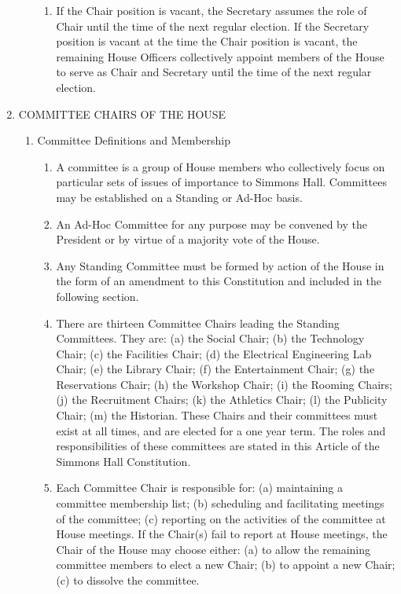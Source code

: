 \documentclass[letterpaper]{article}
\begin{document}
\begin{enumerate}
\begin{enumerate}
\begin{enumerate}
\item If the Chair position is vacant, the Secretary assumes the role of Chair until the time of the next regular election. If the Secretary position is vacant at the time the Chair position is vacant, the remaining House Officers collectively appoint members of the House to serve as Chair and Secretary until the time of the next regular
election.

\end{enumerate}

\end{enumerate}

\item COMMITTEE CHAIRS OF THE HOUSE 

\begin{enumerate}

\item Committee Definitions and Membership 

\begin{enumerate}

\item A committee is a group of House members who collectively focus on particular sets of issues of importance to Simmons Hall. Committees may be established on a Standing or Ad-Hoc basis.

\item An Ad-Hoc Committee for any purpose may be convened by the President or by virtue of a majority vote of the House.

\item Any Standing Committee must be formed by action of the House in the form of an amendment to this Constitution and included in the following section.

\item There are thirteen Committee Chairs leading the Standing Committees. They are: (a) the Social Chair; (b) the Technology Chair; (c) the Facilities Chair; (d) the Electrical Engineering Lab Chair; (e) the Library Chair; (f) the Entertainment Chair; (g) the Reservations Chair; (h) the Workshop Chair; (i) the Rooming Chairs; (j) the Recruitment Chairs; (k) the Athletics Chair; (l) the Publicity Chair; (m) the Historian. These Chairs and their committees must exist at all times, and are elected for a one year term. The roles and responsibilities of these committees are stated in this Article of the Simmons Hall Constitution.

\item Each Committee Chair is responsible for: (a) maintaining a committee membership list; (b) scheduling and facilitating meetings of the committee; (c) reporting on the activities of the committee at House meetings. If the Chair(s) fail to report at House meetings, the Chair of the House may choose either: (a) to allow the remaining committee members to elect a new Chair; (b) to appoint a new Chair; (c) to dissolve the committee.


\end{enumerate}
\end{enumerate}
\end{enumerate}
\end{document}
